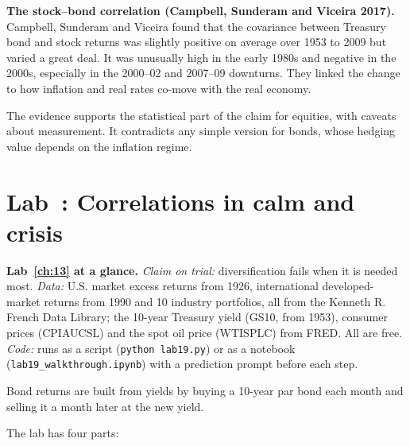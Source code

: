 \textbf{The stock--bond correlation (Campbell, Sunderam and Viceira 2017).} Campbell, Sunderam and Viceira found that the covariance between Treasury bond and stock returns was slightly positive on average over 1953 to 2009 but varied a great deal. It was unusually high in the early 1980s and negative in the 2000s, especially in the 2000--02 and 2007--09 downturns. They linked the change to how inflation and real rates co-move with the real economy.

The evidence supports the statistical part of the claim for equities, with caveats about measurement. It contradicts any simple version for bonds, whose hedging value depends on the inflation regime.

\section{Lab~\thechapter: Correlations in calm and crisis}
\label{sec:13-lab}

\begin{callout}
\textbf{Lab~\ref{ch:13} at a glance.} \emph{Claim on trial:} diversification fails when it is needed most. \emph{Data:} U.S. market excess returns from 1926, international developed-market returns from 1990 and 10 industry portfolios, all from the Kenneth R. French Data Library; the 10-year Treasury yield (GS10, from 1953), consumer prices (CPIAUCSL) and the spot oil price (WTISPLC) from FRED. All are free. \emph{Code:} runs as a script (\texttt{python lab19.py}) or as a notebook (\texttt{lab19\_walkthrough.ipynb}) with a prediction prompt before each step.
\end{callout}

Bond returns are built from yields by buying a 10-year par bond each month and selling it a month later at the new yield.

The lab has four parts:

